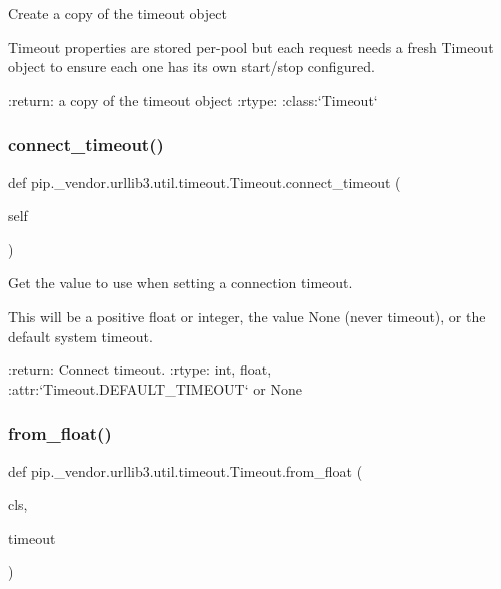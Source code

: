 \begin{DoxyVerb}Create a copy of the timeout object

Timeout properties are stored per-pool but each request needs a fresh
Timeout object to ensure each one has its own start/stop configured.

:return: a copy of the timeout object
:rtype: :class:`Timeout`
\end{DoxyVerb}
 \mbox{\label{classpip_1_1__vendor_1_1urllib3_1_1util_1_1timeout_1_1Timeout_a11c5e5576fdd38589cae3145439f0eeb}} 
\subsubsection{\texorpdfstring{connect\+\_\+timeout()}{connect\_timeout()}}
{\footnotesize\ttfamily def pip.\+\_\+vendor.\+urllib3.\+util.\+timeout.\+Timeout.\+connect\+\_\+timeout (\begin{DoxyParamCaption}\item[{}]{self }\end{DoxyParamCaption})}

\begin{DoxyVerb}Get the value to use when setting a connection timeout.

This will be a positive float or integer, the value None
(never timeout), or the default system timeout.

:return: Connect timeout.
:rtype: int, float, :attr:`Timeout.DEFAULT_TIMEOUT` or None
\end{DoxyVerb}
 \mbox{\label{classpip_1_1__vendor_1_1urllib3_1_1util_1_1timeout_1_1Timeout_a8cdbc1816a9c7a7ce81f3040ef7bc4a5}} 
\subsubsection{\texorpdfstring{from\+\_\+float()}{from\_float()}}
{\footnotesize\ttfamily def pip.\+\_\+vendor.\+urllib3.\+util.\+timeout.\+Timeout.\+from\+\_\+float (\begin{DoxyParamCaption}\item[{}]{cls,  }\item[{}]{timeout }\end{DoxyParamCaption})}

